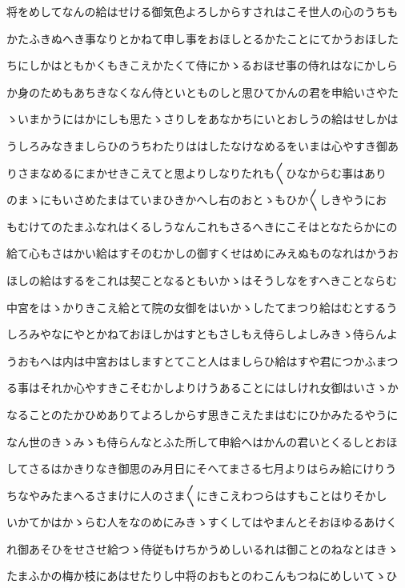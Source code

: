 \documentclass[a4paper,11pt,landscape]{ltjtarticle}
\begin{document}
将をめしてなんの給はせける御気色よろしからすされはこそ世人の心のうちも
\par\medskip
かたふきぬへき事なりとかねて申し事をおほしとるかたことにてかうおほした
\par\medskip
ちにしかはともかくもきこえかたくて侍にかゝるおほせ事の侍れはなにかしら
\par\medskip
か身のためもあちきなくなん侍といとものしと思ひてかんの君を申給いさやた
\par\medskip
ゝいまかうにはかにしも思たゝさりしをあなかちにいとおしうの給はせしかは
\par\medskip
うしろみなきましらひのうちわたりははしたなけなめるをいまは心やすき御あ
\par\medskip
りさまなめるにまかせきこえてと思よりしなりたれも〱ひなからむ事はあり
\par\medskip
のまゝにもいさめたまはていまひきかへし右のおとゝもひか〱しきやうにお
\par\medskip
もむけてのたまふなれはくるしうなんこれもさるへきにこそはとなたらかにの
\par\medskip
給て心もさはかい給はすそのむかしの御すくせはめにみえぬものなれはかうお
\par\medskip
ほしの給はするをこれは契ことなるともいかゝはそうしなをすへきことならむ
\par\medskip
中宮をはゝかりきこえ給とて院の女御をはいかゝしたてまつり給はむとするう
\par\medskip
しろみやなにやとかねておほしかはすともさしもえ侍らしよしみきゝ侍らんよ
\par\medskip
うおもへは内は中宮おはしますとてこと人はましらひ給はすや君につかふまつ
\par\medskip
る事はそれか心やすきこそむかしよりけうあることにはしけれ女御はいさゝか
\par\medskip
なることのたかひめありてよろしからす思きこえたまはむにひかみたるやうに
\par\medskip
なん世のきゝみゝも侍らんなとふた所して申給へはかんの君いとくるしとおほ
\par\medskip
してさるはかきりなき御思のみ月日にそへてまさる七月よりはらみ給にけりう
\par\medskip
ちなやみたまへるさまけに人のさま〱にきこえわつらはすもことはりそかし
\par\medskip
いかてかはかゝらむ人をなのめにみきゝすくしてはやまんとそおほゆるあけく
\par\medskip
れ御あそひをせさせ給つゝ侍従もけちかうめしいるれは御ことのねなとはきゝ
\par\medskip
たまふかの梅か枝にあはせたりし中将のおもとのわこんもつねにめしいてゝひ
\end{document}
